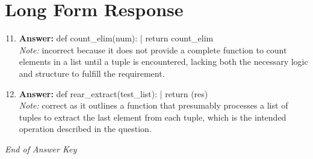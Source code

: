 \documentclass[12pt]{article}
\begin{document}
\section*{Long Form Response}
\begin{enumerate}[label=\arabic*.]
\setcounter{enumi}{10}
\item \textbf{Answer:} def count\_elim(num): | return count\_elim
\\ \textit{Note:} incorrect because it does not provide a complete function to count elements in a list until a tuple is encountered, lacking both the necessary logic and structure to fulfill the requirement.
\item \textbf{Answer:} def rear\_extract(test\_list): | return (res)
\\ \textit{Note:} correct as it outlines a function that presumably processes a list of tuples to extract the last element from each tuple, which is the intended operation described in the question.
\end{enumerate}

\vfill
\noindent\textit{End of Answer Key}
\end{document}
